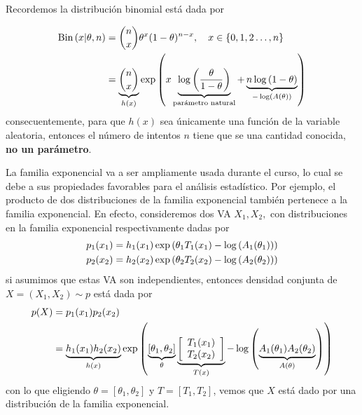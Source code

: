 \begin{example}
Recordemos la distribución binomial está dada por 

\begin{align*}
	\text{Bin}\left(x|\theta,n\right) 	&=\binom{n}{x}\theta^x(1-\theta)^{n-x},\quad x\in\{0,1,2\ldots,n\}\\
					&=
					\underbrace{\binom{n}{x}}_{h(x)}\exp\left(x\underbrace{\log\left(\frac{\theta}{1-\theta}\right)}_{\text{parámetro natural}} + \underbrace{n\log\left(1-\theta\right)}_{-\log\left(A(\theta)\right)}\right)\\
\end{align*}
consecuentemente, para que $h(x)$ sea únicamente una función de la variable aleatoria, entonces el número de intentos $n$ tiene que se una cantidad conocida, \textbf{no un parámetro}. 	
 \end{example} 



La familia exponencial va a ser ampliamente usada durante el curso, lo cual se debe a sus propiedades favorables para el análisis estadístico. Por ejemplo, el producto de dos distribuciones de la familia exponencial también pertenece a la familia exponencial. En efecto, consideremos dos VA $X_1,X_2,$ con distribuciones en la familia exponencial respectivamente dadas por
\begin{align}
	p_1(x_1) &= h_1(x_1)\exp\left(\theta_1T_1(x_1)-\log\left(A_1(\theta_1)\right)\right)\\
	p_2(x_2) &= h_2(x_2)\exp\left(\theta_2T_2(x_2)-\log\left(A_2(\theta_2)\right)\right)
\end{align}
si asumimos que estas VA son independientes, entonces densidad conjunta de $X=(X_1,X_2)\sim p$ está dada por
\begin{align}
	p(X) 	&= p_1(x_1) p_2(x_2) \nonumber \\ 
			&= \underbrace{h_1(x_1)h_2(x_2)}_{h(x)}\exp\left(\underbrace{[\theta_1,\theta_2]}_{\theta}\underbrace{
			\left[ \begin{array}{c}
			T_1(x_1)  \\
			T_2(x_2)  \end{array} \right]
			}_{T(x)} - \log\left(\underbrace{A_1(\theta_1)A_2(\theta_2)}_{A(\theta)}\right)\right) 
\end{align}
con lo que eligiendo $\theta=[\theta_1,\theta_2]$ y $T=[T_1,T_2]$, vemos que $X$ está dado por una distribución de la familia exponencial.  

